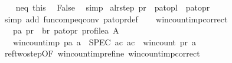 \begin{isabellebody}
\ \ \isamarkupfalse%
\ neq\ this\ \isamarkupfalse%
\ {\isachardoublequoteopen}False{\isachardoublequoteclose}\ \isamarkupfalse%
\ simp\isanewline
{}\isamarkupfalse%
%
\endisatagproof
{\isafoldproof}%
%
\isadelimproof
\isanewline
%
\endisadelimproof
\isanewline
{}\isamarkupfalse%
\ a{\isacharunderscore}{\kern0pt}l{\isacharunderscore}{\kern0pt}r{\isacharunderscore}{\kern0pt}step{\isacharcolon}{\kern0pt}\ {\isachardoublequoteopen}{\isacharparenleft}{\kern0pt}pr{}{\isacharunderscore}{\kern0pt}{\isasymalpha}\ {\isasymcirc}\ pa{\isacharunderscore}{\kern0pt}to{\isacharunderscore}{\kern0pt}pl{\isacharparenright}{\kern0pt}\ {\isacharequal}{\kern0pt}\ pa{\isacharunderscore}{\kern0pt}to{\isacharunderscore}{\kern0pt}pr{\isachardoublequoteclose}\isanewline
%
\isadelimproof
\ \ %
\endisadelimproof
%
\isatagproof
{}\isamarkupfalse%
\ {\isacharparenleft}{\kern0pt}simp\ add{\isacharcolon}{\kern0pt}\ fun{\isacharunderscore}{\kern0pt}comp{\isacharunderscore}{\kern0pt}eq{\isacharunderscore}{\kern0pt}conv\ pa{\isacharunderscore}{\kern0pt}to{\isacharunderscore}{\kern0pt}pr{\isacharunderscore}{\kern0pt}def{\isacharparenright}{\kern0pt}%
\endisatagproof
{\isafoldproof}%
%
\isadelimproof
\isanewline
%
\endisadelimproof
\ \ \isanewline
{}\isamarkupfalse%
\ win{\isacharunderscore}{\kern0pt}count{\isacharunderscore}{\kern0pt}imp{}{\isacharunderscore}{\kern0pt}correct{\isacharcolon}{\kern0pt}\isanewline
\ \ \ {\isachardoublequoteopen}{\isacharparenleft}{\kern0pt}pa{\isacharcomma}{\kern0pt}\ pr{\isacharparenright}{\kern0pt}\ {\isasymin}\ br\ pa{\isacharunderscore}{\kern0pt}to{\isacharunderscore}{\kern0pt}pr\ {\isacharparenleft}{\kern0pt}profile{\isacharunderscore}{\kern0pt}a\ A{\isacharparenright}{\kern0pt}{\isachardoublequoteclose}\isanewline
\ \ \ {\isachardoublequoteopen}win{\isacharunderscore}{\kern0pt}count{\isacharunderscore}{\kern0pt}imp{}\ pa\ a\ {\isasymle}\ SPEC\ {\isacharparenleft}{\kern0pt}{\isasymlambda}ac{\isachardot}{\kern0pt}\ ac\ {\isacharequal}{\kern0pt}\ win{\isacharunderscore}{\kern0pt}count\ pr\ a{\isacharparenright}{\kern0pt}{\isachardoublequoteclose}\isanewline
%
\isadelimproof
\ \ %
\endisadelimproof
%
\isatagproof
{}\isamarkupfalse%
\ ref{\isacharunderscore}{\kern0pt}two{\isacharunderscore}{\kern0pt}step{\isacharbrackleft}{\kern0pt}OF\ win{\isacharunderscore}{\kern0pt}count{\isacharunderscore}{\kern0pt}imp{}{\isacharunderscore}{\kern0pt}refine\ win{\isacharunderscore}{\kern0pt}count{\isacharunderscore}{\kern0pt}imp{\isacharprime}{\kern0pt}{\isacharunderscore}{\kern0pt}correct{\isacharbrackright}{\kern0pt}\isanewline

\end{isabellebody}
